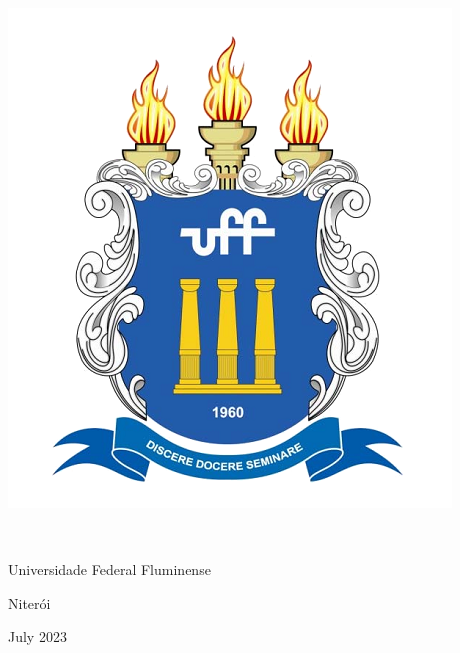 %
%

\thispagestyle{empty}

{\sffamily\centering\Large

\includegraphics[scale=0.25]{modelo/UFF_brasao.png}

~\vspace{2cm}

Universidade Federal Fluminense

\vspace{\fill}

{\huge\TITULO}

\vspace{3.5cm}

{\LARGE\AUTOR}

\vspace{\fill}


{\large Niterói }


{\large  July 2023}


}

\clearpage

%
%

\thispagestyle{empty}

